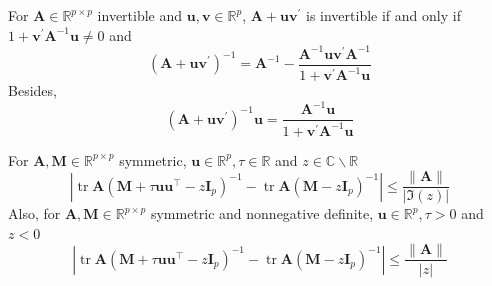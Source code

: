 
\begin{lemma} \label{lem:sherman-morrison}
    For $\mathbf{A}\in\mathbb{R}^{p\times p}$ invertible and $\mathbf{u},\mathbf{v}\in\mathbb{R}^{p}$, $\mathbf{A}+\mathbf{u v}^{\prime}$ is invertible if and only if $1+\mathbf{v}^{\prime} \mathbf{A}^{-1} \mathbf{u} \neq 0$ and
    $$
        \left(\mathbf{A}+\mathbf{u v}^{\prime}\right)^{-1}=\mathbf{A}^{-1}-\frac{\mathbf{A}^{-1} \mathbf{u v}^{\prime} \mathbf{A}^{-1}}{1+\mathbf{v}^{\prime} \mathbf{A}^{-1} \mathbf{u}}
    $$
    Besides,
    $$
        \left(\mathbf{A}+\mathbf{u v}^{\prime}\right)^{-1} \mathbf{u}=\frac{\mathbf{A}^{-1} \mathbf{u}}{1+\mathbf{v}^{\prime} \mathbf{A}^{-1} \mathbf{u}}
    $$
\end{lemma}

\begin{lemma}
    For $\mathbf{A}, \mathbf{M} \in \mathbb{R}^{p \times p}$ symmetric, $\mathbf{u} \in \mathbb{R}^{p}, \tau \in \mathbb{R}$ and $z \in \mathbb{C} \backslash \mathbb{R}$
    $$
        \left|\operatorname{tr} \mathbf{A}\left(\mathbf{M}+\tau \mathbf{u u}^{\top}-z \mathbf{I}_{p}\right)^{-1}-\operatorname{tr} \mathbf{A}\left(\mathbf{M}-z \mathbf{I}_{p}\right)^{-1}\right| \leq \frac{\|\mathbf{A}\|}{|\Im(z)|}
    $$
    Also, for $\mathbf{A}, \mathbf{M} \in \mathbb{R}^{p \times p}$ symmetric and nonnegative definite, $\mathbf{u} \in \mathbb{R}^{p}, \tau>0$ and $z<0$
    $$
        \left|\operatorname{tr} \mathbf{A}\left(\mathbf{M}+\tau \mathbf{u} \mathbf{u}^{\top}-z \mathbf{I}_{p}\right)^{-1}-\operatorname{tr} \mathbf{A}\left(\mathbf{M}-z \mathbf{I}_{p}\right)^{-1}\right| \leq \frac{\|\mathbf{A}\|}{|z|}
    $$
\end{lemma}

